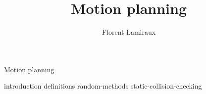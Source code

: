 \documentclass[xcolor = {svgnames,x11names}]{beamer}
\title {Motion planning}
\subtitle{}
\author[]
{Florent Lamiraux}
\institute[CNRS-LAAS] %
{
  CNRS-LAAS, Toulouse, France
}
\date[] %
{}
\begin{document}
\lstset{
breakatwhitespace=true,
breaklines=true
tabsize=3,
}

\begin{frame}
  \titlepage
\end{frame}

%
\begin{frame}{Motion planning}
\end{frame}

 {introduction}
 {definitions}
 {random-methods}
 {static-collision-checking}
\end{document}
